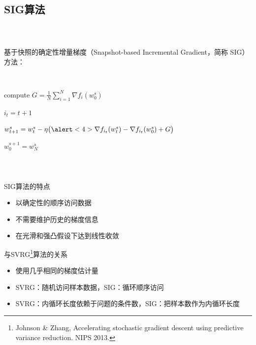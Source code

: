\subsection{SIG算法}
\frame
{
\frametitle{\subsecname~ }
基于快照的确定性增量梯度（Snapshot-based Incremental Gradient，简称 SIG）方法：

{
\setlength{\interspacetitleruled}{-.4pt}%
\begin{algorithm}[H]
\SetAlgoLined
{} \
{
    \alert<2>{compute $G = \frac{1}{N} \sum_{i=1}^{N} \nabla f_i(w_0^s)$} \

    {
    \alert<3>{$i_t = t+1$} \


    $w_{t+1}^{s} = w_t^s - \eta \big(\alert<4>{\nabla f_{i_t}(w_t^s) - \nabla f_{i_t}(w_0^s) + G} \big)$ \

    }
    \alert<5>{$w_0^{s+1} = w_N^s$} \only<5>{\alert{更新快照点}}\
}
\end{algorithm}
}

}

\frame
{
\footnotesize
\frametitle{\subsecname~ }
\begin{block}{SIG算法的特点}
    \begin{itemize}
        \item 以确定性的顺序访问数据
        \item 不需要维护历史的梯度信息
        \item 在光滑和强凸假设下达到线性收敛
    \end{itemize}
\end{block}


{
\begin{block}{与SVRG\footnote{Johnson \& Zhang, Accelerating stochastic gradient descent using predictive variance reduction. NIPS 2013.}算法的关系}
    \begin{itemize}
        \item 使用几乎相同的梯度估计量
        \item SVRG：随机访问样本数据，SIG：循环顺序访问
        \item SVRG：内循环长度依赖于问题的条件数，SIG：把样本数作为内循环长度
    \end{itemize}
\end{block}
}

}

